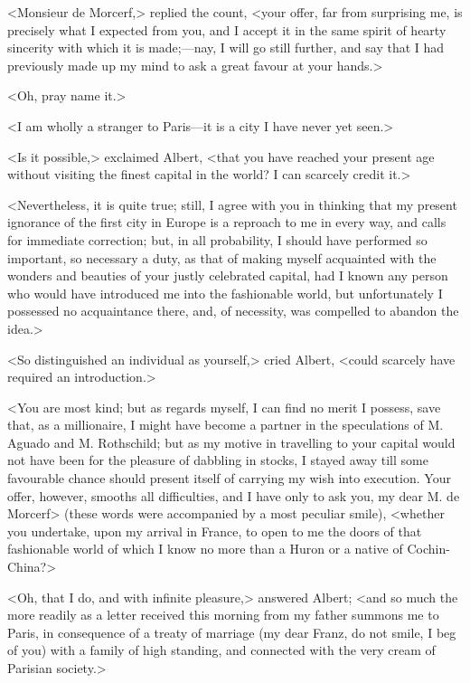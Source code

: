  <Monsieur de Morcerf,> replied the count, <your offer, far from surprising me, is precisely what I expected from you, and I accept it in the same spirit of hearty sincerity with which it is made;—nay, I will go still further, and say that I had previously made up my mind to ask a great favour at your hands.> 

 <Oh, pray name it.> 

 <I am wholly a stranger to Paris—it is a city I have never yet seen.> 

 <Is it possible,> exclaimed Albert, <that you have reached your present age without visiting the finest capital in the world? I can scarcely credit it.> 

 <Nevertheless, it is quite true; still, I agree with you in thinking that my present ignorance of the first city in Europe is a reproach to me in every way, and calls for immediate correction; but, in all probability, I should have performed so important, so necessary a duty, as that of making myself acquainted with the wonders and beauties of your justly celebrated capital, had I known any person who would have introduced me into the fashionable world, but unfortunately I possessed no acquaintance there, and, of necessity, was compelled to abandon the idea.> 

 <So distinguished an individual as yourself,> cried Albert, <could scarcely have required an introduction.> 

 <You are most kind; but as regards myself, I can find no merit I possess, save that, as a millionaire, I might have become a partner in the speculations of M. Aguado and M. Rothschild; but as my motive in travelling to your capital would not have been for the pleasure of dabbling in stocks, I stayed away till some favourable chance should present itself of carrying my wish into execution. Your offer, however, smooths all difficulties, and I have only to ask you, my dear M. de Morcerf> (these words were accompanied by a most peculiar smile), <whether you undertake, upon my arrival in France, to open to me the doors of that fashionable world of which I know no more than a Huron or a native of Cochin-China?> 

 <Oh, that I do, and with infinite pleasure,> answered Albert; <and so much the more readily as a letter received this morning from my father summons me to Paris, in consequence of a treaty of marriage (my dear Franz, do not smile, I beg of you) with a family of high standing, and connected with the very cream of Parisian society.> 

